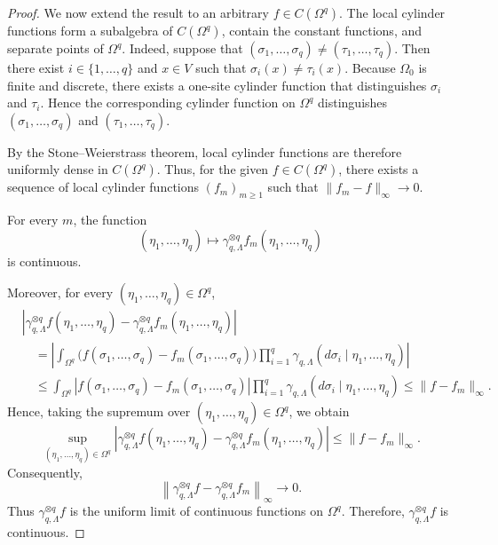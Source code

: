\documentclass[11pt,reqno]{amsart}
\numberwithin{equation}{section} \setcounter{tocdepth}{1}
\begin{document}
\begin{proof}
	We now extend the result to an arbitrary
	$f\in C(\Omega^q)$. The local cylinder functions form a subalgebra
	of $C(\Omega^q)$, contain the constant functions, and separate
	points of $\Omega^q$. Indeed, suppose that
	$
	(\sigma_1,\ldots,\sigma_q)
	\neq
	(\tau_1,\ldots,\tau_q).
	$
	Then there exist $i\in\{1,\ldots,q\}$ and $x\in V$ such that
	$
	\sigma_i(x)\neq\tau_i(x).
	$
	Because $\Omega_0$ is finite and discrete, there exists a
	one-site cylinder function that distinguishes $\sigma_i$ and
	$\tau_i$. Hence the corresponding cylinder function on $\Omega^q$
	distinguishes
	$(\sigma_1,\ldots,\sigma_q)$ and
	$(\tau_1,\ldots,\tau_q)$.
	
	By the Stone--Weierstrass theorem, local cylinder functions are
	therefore uniformly dense in $C(\Omega^q)$. Thus, for the given
	$f\in C(\Omega^q)$, there exists a sequence of local cylinder
	functions $(f_m)_{m\ge1}$ such that
	$
	\|f_m-f\|_\infty\longrightarrow0.
	$
	
	For every $m$, the function
	\[
	(\eta_1,\ldots,\eta_q)
	\longmapsto
	\gamma_{q,\Lambda}^{\otimes q}f_m
	(\eta_1,\ldots,\eta_q)
	\]
	is continuous.
	
	Moreover, for every
	$(\eta_1,\ldots,\eta_q)\in\Omega^q$,
	\begin{align*}
		&\left|
		\gamma_{q,\Lambda}^{\otimes q}f
		(\eta_1,\ldots,\eta_q)
		-
		\gamma_{q,\Lambda}^{\otimes q}f_m
		(\eta_1,\ldots,\eta_q)
		\right|
		\\
		&\quad=
		\left|
		\int_{\Omega^q}
		\bigl(
		f(\sigma_1,\ldots,\sigma_q)
		-
		f_m(\sigma_1,\ldots,\sigma_q)
		\bigr)
		\prod_{i=1}^q
		\gamma_{q,\Lambda}
		(d\sigma_i\mid\eta_1,\ldots,\eta_q)
		\right|
		\\
		&\quad\leq
		\int_{\Omega^q}
		\left|
		f(\sigma_1,\ldots,\sigma_q)
		-
		f_m(\sigma_1,\ldots,\sigma_q)
		\right|
		\prod_{i=1}^q
		\gamma_{q,\Lambda}
		(d\sigma_i\mid\eta_1,\ldots,\eta_q)
	\leq
		\|f-f_m\|_\infty.
	\end{align*}
	Hence, taking the supremum over
	$(\eta_1,\ldots,\eta_q)\in\Omega^q$, we obtain
	\[
	\sup_{(\eta_1,\ldots,\eta_q)\in\Omega^q}
	\left|
	\gamma_{q,\Lambda}^{\otimes q}f
	(\eta_1,\ldots,\eta_q)
	-
	\gamma_{q,\Lambda}^{\otimes q}f_m
	(\eta_1,\ldots,\eta_q)
	\right|
	\leq
	\|f-f_m\|_\infty.
	\]
	Consequently,
	\[
	\left\|
	\gamma_{q,\Lambda}^{\otimes q}f
	-
	\gamma_{q,\Lambda}^{\otimes q}f_m
	\right\|_\infty
	\longrightarrow0.
	\]
	Thus $\gamma_{q,\Lambda}^{\otimes q}f$ is the uniform limit of
	continuous functions on $\Omega^q$. Therefore,
	$\gamma_{q,\Lambda}^{\otimes q}f$ is continuous.
\end{proof}
\end{document}

